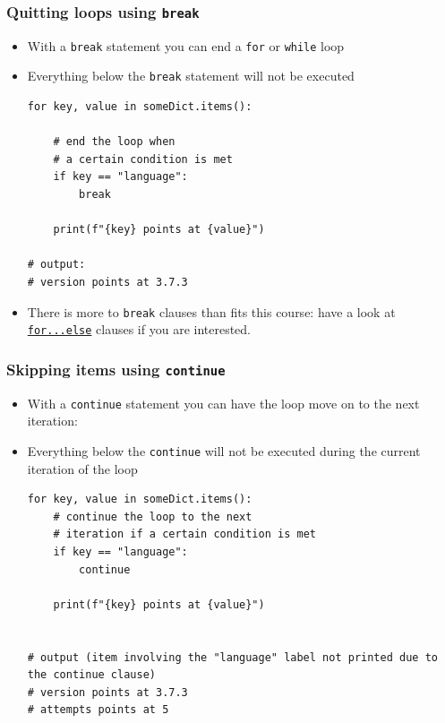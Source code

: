 \documentclass[xcolor=table]{beamer}
\begin{document}
\begin{frame}[fragile]
\frametitle{Quitting loops using \texttt{break}}
\begin{itemize}\addtolength{\itemsep}{0.5\baselineskip}
        \item With a \texttt{break} statement you can end a \texttt{for} or \texttt{while} loop
        \item Everything below the \texttt{break} statement will not be executed
\begin{lstlisting}[style=python]
for key, value in someDict.items():
    
    # end the loop when
    # a certain condition is met
    if key == "language":
        break

    print(f"{key} points at {value}")

# output:
# version points at 3.7.3
\end{lstlisting}
        \item There is more to \texttt{break} clauses than fits this course: have a look at \href{https://docs.python.org/3/tutorial/controlflow.html#break-and-continue-statements-and-else-clauses-on-loops}{\texttt{for...else}} clauses if you are interested.
    \end{itemize}
\end{frame}

\begin{frame}[fragile]
    \frametitle{Skipping items using \texttt{continue}}
\begin{itemize}\addtolength{\itemsep}{0.5\baselineskip}
        \item With a \texttt{continue} statement you can have the loop move on to the next iteration:
        \item Everything below the \texttt{continue} will not be executed during the current iteration of the loop
\begin{lstlisting}[style=python]
for key, value in someDict.items():
    # continue the loop to the next
    # iteration if a certain condition is met
    if key == "language":
        continue

    print(f"{key} points at {value}")


# output (item involving the "language" label not printed due to the continue clause)
# version points at 3.7.3
# attempts points at 5
\end{lstlisting}
    \end{itemize}
\end{frame}



\end{document}
